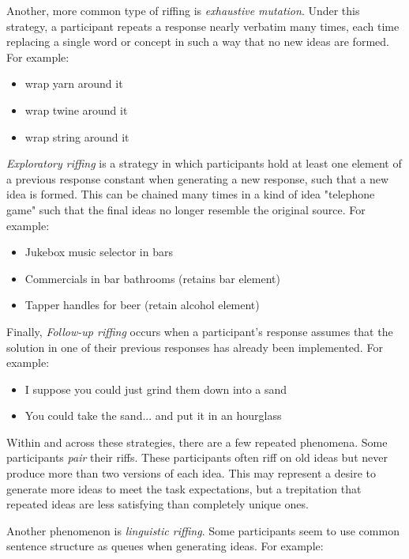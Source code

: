 Another, more common type of riffing is \emph{exhaustive mutation}. Under this strategy, a participant repeats a response nearly verbatim many times, each time replacing a single word or concept in such a way that no new ideas are formed. For example:

\begin{itemize}
    \item wrap yarn around it
    \item wrap twine around it
    \item wrap string around it
\end{itemize}

\emph{Exploratory riffing} is a strategy in which participants hold at least one element of a previous response constant when generating a new response, such that a new idea is formed. This can be chained many times in a kind of idea "telephone game" such that the final ideas no longer resemble the original source. For example:

\begin{itemize}
    \item Jukebox music selector in bars
    \item Commercials in bar bathrooms (retains bar element)
    \item Tapper handles for beer (retain alcohol element)
\end{itemize}

Finally, \emph{Follow-up riffing} occurs when a participant's response assumes that the solution in one of their previous responses has already been implemented. For example:

\begin{itemize}
    \item I suppose you could just grind them down into a sand
    \item You could take the sand... and put it in an hourglass
\end{itemize}

Within and across these strategies, there are a few repeated phenomena.
Some participants \emph{pair} their riffs. These participants  often riff on old ideas but never produce more than two versions of each idea. This may represent a desire to generate more ideas to meet the task expectations, but a trepitation that repeated ideas are less satisfying than completely unique ones.

Another phenomenon is \emph{linguistic riffing}. Some participants seem to use common sentence structure as queues when generating ideas. For example:

